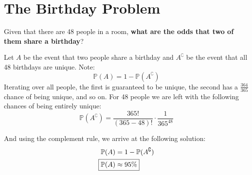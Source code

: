 \documentclass[titlepage, 12pt, leqno]{article}
\begin{document}
\section{The Birthday Problem}
Given that there are 48 people in a room, \textbf{what are the odds that two of them share a birthday}? 

Let $A$ be the event that two people share a birthday and $A^\complement $ be the event that all 48 birthdays are unique. Note:
\[
    \mathbb{P}(A) = 1 - \mathbb{P}(A^\complement )
\]
Iterating over all people, the first is guaranteed to be unique, the second has a $\frac{364}{365}$ chance of being unique, and so on. For 48 people we are left with the following chances of being entirely unique:
\[
    \mathbb{P}(A^\complement ) = \frac{365!}{(365-48)!} \cdot \frac{1}{365^{48}} 
\]

And using the complement rule, we arrive at the following solution:
\begin{align*}
    \mathbb{P}(A) &= 1 - \mathbb{P}(A^\complement ) \\
    \Aboxed{\mathbb{P}(A) &\approx 95\%} 
\end{align*}
\pagebreak
\end{document}
